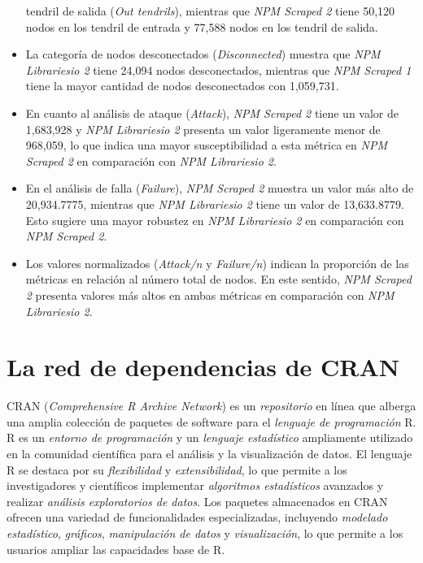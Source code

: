 \begin{itemize}
          tendril de salida (\textit{Out tendrils}), mientras que \textit{NPM Scraped 2} tiene
          50,120 nodos en los tendril de entrada y 77,588 nodos en los tendril de salida.
    \item La categoría de nodos desconectados (\textit{Disconnected}) muestra que
          \textit{NPM Librariesio 2} tiene 24,094 nodos desconectados, mientras que
          \textit{NPM Scraped 1} tiene la mayor cantidad de nodos desconectados con
          1,059,731.
    \item En cuanto al análisis de ataque (\textit{Attack}), \textit{NPM Scraped 2} tiene
          un valor de 1,683,928 y \textit{NPM Librariesio 2} presenta un valor ligeramente menor
          de 968,059, lo que indica una mayor susceptibilidad a esta métrica en \textit{NPM Scraped 2}
          en comparación con \textit{NPM Librariesio 2}.
    \item En el análisis de falla (\textit{Failure}), \textit{NPM Scraped 2} muestra un valor
          más alto de 20,934.7775, mientras que \textit{NPM Librariesio 2} tiene un valor de
          13,633.8779. Esto sugiere una mayor robustez en \textit{NPM Librariesio 2} en comparación
          con \textit{NPM Scraped 2}.
    \item Los valores normalizados (\textit{Attack/n} y \textit{Failure/n}) indican la
          proporción de las métricas en relación al número total de nodos. En este sentido,
          \textit{NPM Scraped 2} presenta valores más altos en ambas métricas en comparación
          con \textit{NPM Librariesio 2}.
\end{itemize}

\section{La red de dependencias de CRAN}

CRAN (\textit{Comprehensive R Archive Network}) es un \textit{repositorio} en línea que alberga
una amplia colección de paquetes de software para el \textit{lenguaje de programación} R.
R es un \textit{entorno de programación} y un \textit{lenguaje estadístico} ampliamente
utilizado en la comunidad científica para el análisis y la visualización de datos.
El lenguaje R se destaca por su \textit{flexibilidad} y \textit{extensibilidad},
lo que permite a los investigadores y científicos implementar \textit{algoritmos estadísticos}
avanzados y realizar \textit{análisis exploratorios de datos}.
Los paquetes almacenados en CRAN ofrecen una variedad de funcionalidades especializadas,
incluyendo \textit{modelado estadístico}, \textit{gráficos}, \textit{manipulación de datos}
y \textit{visualización}, lo que permite a los usuarios ampliar las capacidades base de R.

